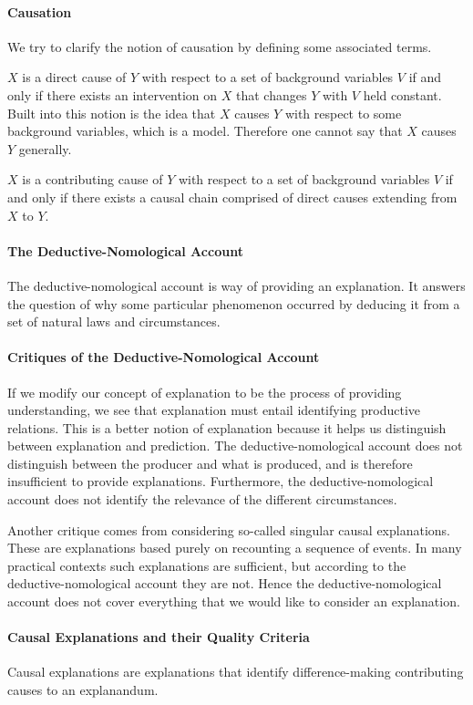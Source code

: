 \paragraph{Causation}
We try to clarify the notion of causation by defining some associated terms.

$X$ is a direct cause of $Y$ with respect to a set of background variables $V$ if and only if there exists an intervention on $X$ that changes $Y$ with $V$ held constant. Built into this notion is the idea that $X$ causes $Y$ with respect to some background variables, which is a model. Therefore one cannot say that $X$ causes $Y$ generally.

$X$ is a contributing cause of $Y$ with respect to a set of background variables $V$ if and only if there exists a causal chain comprised of direct causes extending from $X$ to $Y$.

\paragraph{The Deductive-Nomological Account}
The deductive-nomological account is way of providing an explanation. It answers the question of why some particular phenomenon occurred by deducing it from a set of natural laws and circumstances.

\paragraph{Critiques of the Deductive-Nomological Account}
If we modify our concept of explanation to be the process of providing understanding, we see that explanation must entail identifying productive relations. This is a better notion of explanation because it helps us distinguish between explanation and prediction. The deductive-nomological account does not distinguish between the producer and what is produced, and is therefore insufficient to provide explanations. Furthermore, the deductive-nomological account does not identify the relevance of the different circumstances.

Another critique comes from considering so-called singular causal explanations. These are explanations based purely on recounting a sequence of events. In many practical contexts such explanations are sufficient, but according to the deductive-nomological account they are not. Hence the deductive-nomological account does not cover everything that we would like to consider an explanation.

\paragraph{Causal Explanations and their Quality Criteria}
Causal explanations are explanations that identify difference-making contributing causes to an explanandum.

